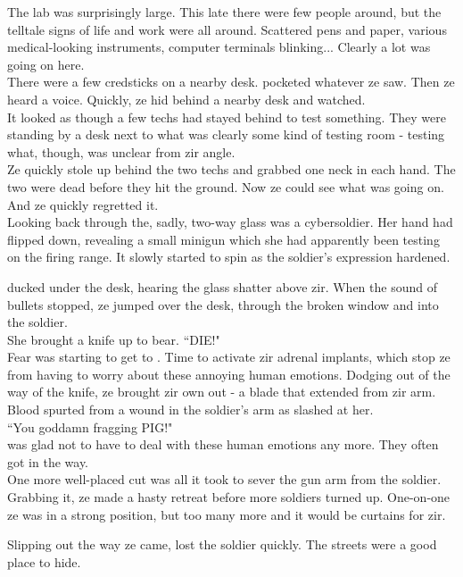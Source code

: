 The lab was surprisingly large. This late there were few people around, but the telltale signs of life and work were all around. Scattered pens and paper, various medical-looking instruments, computer terminals blinking... Clearly a lot was going on here.\\
There were a few credsticks on a nearby desk. \protagonist{} pocketed whatever ze saw.
Then ze heard a voice. Quickly, ze hid behind a nearby desk and watched.\\
It looked as though a few techs had stayed behind to test something. They were standing by a desk next to what was clearly some kind of testing room - testing what, though, was unclear from zir angle.\\
Ze quickly stole up behind the two techs and grabbed one neck in each hand. The two were dead before they hit the ground. Now ze could see what was going on.\\
And ze quickly regretted it.\\
Looking back through the, sadly, two-way glass was a cybersoldier. Her hand had flipped down, revealing a small minigun which she had apparently been testing on the firing range. It slowly started to spin as the soldier's expression hardened.

\protagonist{} ducked under the desk, hearing the glass shatter above zir. When the sound of bullets stopped, ze jumped over the desk, through the broken window and into the soldier.\\
She brought a knife up to bear. ``DIE!"\\
Fear was starting to get to \protagonist{}. Time to activate zir adrenal implants, which stop ze from having to worry about these annoying human emotions. Dodging out of the way of the knife, ze brought zir own out - a blade that extended from zir arm.\\
Blood spurted from a wound in the soldier's arm as \protagonist{} slashed at her.\\
``You goddamn fragging PIG!"\\
\protagonist{} was glad not to have to deal with these human emotions any more. They often got in the way.\\
One more well-placed cut was all it took to sever the gun arm from the soldier. Grabbing it, ze made a hasty retreat before more soldiers turned up. One-on-one ze was in a strong position, but too many more and it would be curtains for zir.

Slipping out the way ze came, \protagonist{} lost the soldier quickly. The streets were a good place to hide.

